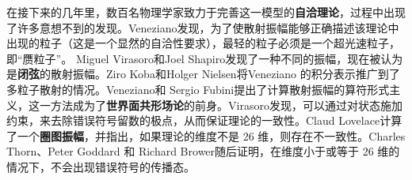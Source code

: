 在接下来的几年里，数百名物理学家致力于完善这一模型的\textbf{自洽理论}，过程中出现了许多意想不到的发现。Veneziano发现，为了使散射振幅能够正确描述该理论中出现的粒子（这是一个显然的自洽性要求），最轻的粒子必须是一个超光速粒子，即“赝粒子”。  
Miguel Virasoro和Joel Shapiro发现了一种不同的振幅，现在被认为是\textbf{闭弦}的散射振幅。Ziro Koba和Holger Nielsen将Veneziano 的积分表示推广到了多粒子散射的情况。Veneziano和 Sergio Fubini提出了计算散射振幅的算符形式主义，这一方法成为了\textbf{世界面共形场论}的前身。Virasoro发现，可以通过对状态施加约束，来去除错误符号留数的极点，从而保证理论的一致性。Claud Lovelace计算了一个\textbf{圈图振幅}，并指出，如果理论的维度不是 26 维，则存在不一致性。Charles Thorn、Peter Goddard 和 Richard Brower随后证明，在维度小于或等于 26 维的情况下，不会出现错误符号的传播态。

